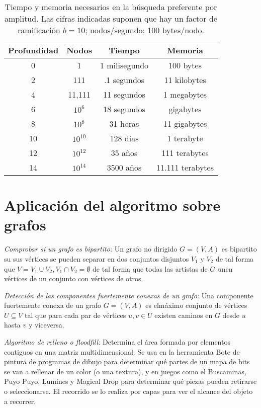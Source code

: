 \documentclass[letterpaper,12pt]{article}
\begin{document}
		\begin{table}[!hbt]
		 	\begin{center}
			 \begin{tabular}{|cccc|} \hline
			  Profundidad & Nodos & Tiempo & Memoria \\ \hline
			  0  & 1 & 1 milisegundo &  100 bytes \\
			  2  & 111 & .1 segundos & 11 kilobytes \\
			  4  &11,111& 11 segundos & 1 megabytes \\
			  6  & $10^6$ & 18 segundos & gigabytes \\
			  8  & $10^8$ & 31 horas & 11 gigabytes \\
			  10 & $10^10$ & 128 dias & 1 terabyte \\
			  12 & $10^12$ & 35 a\~nos &  111 terabytes \\
			  14 & $10^14$ & 3500 a\~nos & 11.111 terabytes \\ \hline
			 \end{tabular}
			\end{center}
			\caption{Tiempo y memoria necesarios en la b\'usqueda preferente por amplitud. Las cifras indicadas suponen que hay un factor de ramificaci\'on $b=10$; nodos/segundo: 100 bytes/nodo.}
		\end{table}
	
	\section{Aplicaci\'on del algoritmo sobre grafos}	
	\begin{description}
		\item \textit{Comprobar si un grafo es bipartito:} Un grafo no dirigido $G=(V,A)$ es bipartito su sus v\'ertices se pueden separar en dos conjuntos disjuntos $V_1$ y $ V_2$ de tal forma que $V = V_1 \cup V_2 , V_1\cap V_2 = \emptyset$ de tal forma que todas las artistas  de $G$ unen v\'ertices de un conjunto con v\'ertices de otros.
		
		\item \textit{Detecci\'on de las componentes fuertemente conexas de un grafo:} Una componente fuertemente conexa de un grafo $G=(V,A)$ es elm\'aximo conjunto de v\'ertices $U \subseteq V$ tal que para cada par de v\'ertices $u,v \in U $ existen caminos en $G$ desde $u$ hasta $v$ y viceversa. 
		
		\item \textit{Algoritmo de relleno o floodfill:} Determina el área formada por elementos contiguos en una matriz multidimensional. Se usa en la herramienta Bote de pintura de programas de dibujo para determinar qué partes de un mapa de bits se van a rellenar de un color (o una textura), y en juegos como el Buscaminas, Puyo Puyo, Lumines y Magical Drop para determinar qué piezas pueden retirarse o seleccionarse. El recorrido se lo realiza por capas para ver el alcance del objeto a recorrer.
	\end{description}
			
\end{document}
